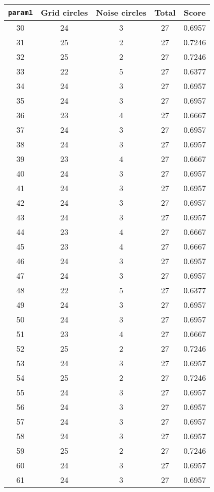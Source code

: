\documentclass[letterpaper, 12pt]{article}
\begin{document}
\begin{longtable}{|c|c|c|c|c|}
\hline
\textbf{\texttt{param1}} & \textbf{Grid circles} & \textbf{Noise circles} & \textbf{Total} & \textbf{Score} \\
\hline
30 & 24 & 3 & 27 & 0.6957 \\
\hline
31 & 25 & 2 & 27 & 0.7246 \\
\hline
32 & 25 & 2 & 27 & 0.7246 \\
\hline
33 & 22 & 5 & 27 & 0.6377 \\
\hline
34 & 24 & 3 & 27 & 0.6957 \\
\hline
35 & 24 & 3 & 27 & 0.6957 \\
\hline
36 & 23 & 4 & 27 & 0.6667 \\
\hline
37 & 24 & 3 & 27 & 0.6957 \\
\hline
38 & 24 & 3 & 27 & 0.6957 \\
\hline
39 & 23 & 4 & 27 & 0.6667 \\
\hline
40 & 24 & 3 & 27 & 0.6957 \\
\hline
41 & 24 & 3 & 27 & 0.6957 \\
\hline
42 & 24 & 3 & 27 & 0.6957 \\
\hline
43 & 24 & 3 & 27 & 0.6957 \\
\hline
44 & 23 & 4 & 27 & 0.6667 \\
\hline
45 & 23 & 4 & 27 & 0.6667 \\
\hline
46 & 24 & 3 & 27 & 0.6957 \\
\hline
47 & 24 & 3 & 27 & 0.6957 \\
\hline
48 & 22 & 5 & 27 & 0.6377 \\
\hline
49 & 24 & 3 & 27 & 0.6957 \\
\hline
50 & 24 & 3 & 27 & 0.6957 \\
\hline
51 & 23 & 4 & 27 & 0.6667 \\
\hline
52 & 25 & 2 & 27 & 0.7246 \\
\hline
53 & 24 & 3 & 27 & 0.6957 \\
\hline
54 & 25 & 2 & 27 & 0.7246 \\
\hline
55 & 24 & 3 & 27 & 0.6957 \\
\hline
56 & 24 & 3 & 27 & 0.6957 \\
\hline
57 & 24 & 3 & 27 & 0.6957 \\
\hline
58 & 24 & 3 & 27 & 0.6957 \\
\hline
59 & 25 & 2 & 27 & 0.7246 \\
\hline
60 & 24 & 3 & 27 & 0.6957 \\
\hline
61 & 24 & 3 & 27 & 0.6957 \\

\end{longtable}
\end{document}
